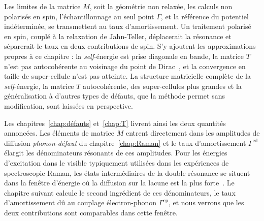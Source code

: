 Les limites de la matrice $M$, soit la géométrie non relaxée, les calculs non polarisés en spin, l'échantillonnage au seul point $\Gamma$, et la référence du potentiel indéterminée, se transmettent au taux d'amortissement. Un traitement polarisé en spin, couplé à la relaxation de Jahn-Teller, déplacerait la résonance et séparerait le taux en deux contributions de spin. S'y ajoutent les approximations propres à ce chapitre : la \textit{self}-énergie est prise diagonale en bande, la matrice $T$ n'est pas autocohérente au voisinage du point de Dirac~\cite{peresElectronicPropertiesDisordered2006}, et la convergence en taille de super-cellule n'est pas atteinte. La structure matricielle complète de la \textit{self}-énergie, la matrice $T$ autocohérente, des super-cellules plus grandes et la généralisation à d'autres types de défauts, que la méthode permet sans modification, sont laissées en perspective.

Les chapitres~\ref{chap:défauts} et~\ref{chap:T} livrent ainsi les deux quantités annoncées. Les éléments de matrice $M$ entrent directement dans les amplitudes de diffusion \textit{phonon-défaut} du chapitre~\ref{chap:Raman} et le taux d'amortissement $\Gamma^\text{ed}$ élargit les dénominateurs résonants de ces amplitudes. Pour les énergies d'excitation dans le visible typiquement utilisées dans les expériences de spectroscopie Raman, les états intermédiaires de la double résonance se situent dans la fenêtre d'énergie où la diffusion sur la lacune est la plus forte~\cite{thomsenDoubleResonantRaman2000}. Le chapitre suivant calcule le second ingrédient de ces dénominateurs, le taux d'amortissement dû au couplage électron-phonon $\Gamma^\text{ep}$, et nous verrons que les deux contributions sont comparables dans cette fenêtre.
